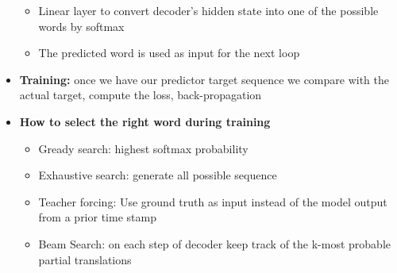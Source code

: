 \begin{itemize}
\begin{itemize}
        \item Linear layer to convert decoder's hidden state into one of the possible words by softmax
        \item The predicted word is used as input for the next loop
    \end{itemize}
    \item \textbf{Training:} once we have our predictor target sequence we compare with the actual target, compute the loss, back-propagation
    \item \textbf{How to select the right word during training}
    \begin{itemize}
        \item Gready search: highest softmax probability
        \item Exhaustive search: generate all possible sequence
        \item Teacher forcing: Use ground truth as input instead of the model output from a prior time stamp
        \item Beam Search: on each step of decoder keep track of the k-most probable partial translations
    \end{itemize}
\end{itemize}

